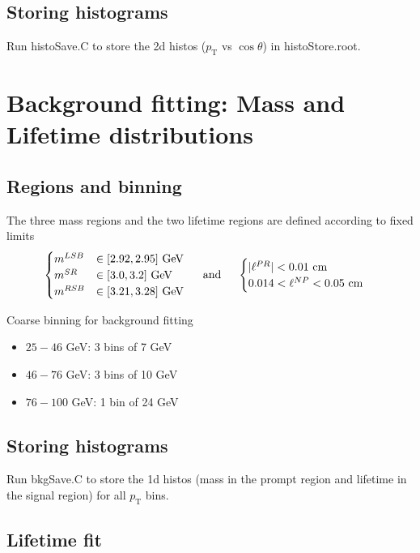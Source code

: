 \documentclass{article}
\newcommand{\pt}{p_\text{T}}
\newcommand{\cost}{\cos\theta}
\begin{document}
\subsection{Storing histograms}

Run histoSave.C to store the 2d histos ($\pt$ vs $\cost$) in histoStore.root.

\pagebreak

\section{Background fitting: Mass and Lifetime distributions}
\subsection{Regions and binning} 

The three mass regions and the two lifetime regions are defined according to fixed limits
\begin{equation}\begin{cases}
m^{LSB}&\in[2.92, 2.95] \text{ GeV}\\
m^{SR}&\in[3.0, 3.2]  \text{ GeV}\\
m^{RSB}&\in[3.21, 3.28]  \text{ GeV}\\
\end{cases}\hspace{0.5cm}\text{and}\hspace{0.5cm}
\begin{cases}
|\ell^{PR}| < 0.01\text{ cm} \\
0.014 < \ell^{NP} < 0.05\text{ cm}
\end{cases}
\end{equation}

Coarse binning for background fitting
\begin{itemize}
\item $25-46$ GeV: 3 bins of 7 GeV
\item $46-76$ GeV: 3 bins of 10 GeV
\item $76-100$ GeV: 1 bin of 24 GeV
\end{itemize}

\subsection{Storing histograms}

Run bkgSave.C to store the 1d histos (mass in the prompt region and lifetime in the signal region) for all $\pt$ bins.

\subsection{Lifetime fit}
\end{document}
